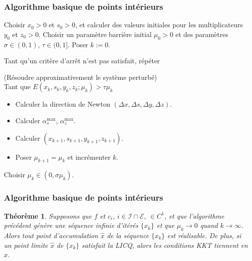 \documentclass[usepdftitle=false,aspectratio=169]{beamer}
\newtheorem{thm}{Théorème}
\def\cE{\mathcal{E}}
\def\cI{\mathcal{I}}
\begin{document}
\begin{frame}
\frametitle{Algorithme basique de points intérieurs}

Choisir $x_0 > 0$ et $s_0 > 0$, et calculer des valeurs initiales pour les multiplicateurs $y_0$ et $z_0 > 0$.
Choisir un paramètre barrière initial $\mu_0 > 0$ et des paramètres $\sigma \in (0, 1)$, $\tau \in (0, 1]$.
Poser $k := 0$.

\mbox{}

Tant qu'un critère d'arrêt n'est pas satisfait, répéter

\hfill\begin{minipage}{\dimexpr\textwidth-1cm}
(Résoudre approximativement le système perturbé) \\
Tant que $E(x_k, s_k, y_k, z_k; \mu_k) > \tau\mu_k$
\begin{itemize}
	\item
	Calculer la direction de Newton $(\Delta x, \Delta s, \Delta y, \Delta z )$.
	\item
	Calculer $\alpha^{\max}_s$, $\alpha^{\max}_z$.
	\item
Calculer $(x_{k+1}, s_{k+1}, y_{k+1}, z_{k+1})$.
\item
Poser $\mu_{k+1} = \mu_k$ et incrémenter $k$.
\end{itemize}
Choisir $\mu_k \in (0, \sigma \mu_k )$.
\end{minipage}

\end{frame}

\begin{frame}
\frametitle{Algorithme basique de points intérieurs}

\begin{thm}
Supposons que $f$ et $c_i$, $i \in \cI \cap \cE$, $\in C^1$, et que l'algorithme précédent génère une séquence infinie d'itérés $\{ x_k \}$ et que $\mu_k \rightarrow 0$ quand $k \rightarrow \infty$.
Alors tout point d'accumulation $\hat{x}$ de la séquence $\{ x_k \}$ est réalisable.
De plus, si un point limite $\hat{x}$ de $\{ x_k \}$ satisfait la LICQ, alors les conditions KKT tiennent en $\hat{x}$.
\end{thm}

\end{frame}
\end{document}
